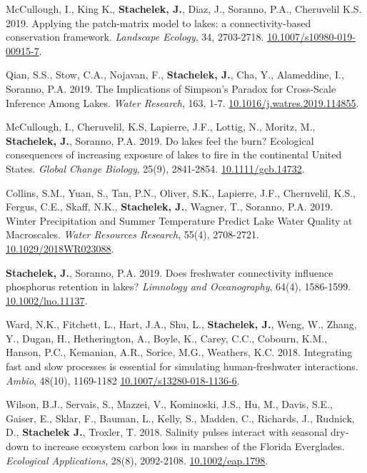\documentclass[11pt]{article}
\makeatletter
\newlength{\bibhang}
\newlength{\bibsep}
 {\@listi \global\bibsep\itemsep \global\advance\bibsep by\parsep}
\newenvironment{bibenum*}
  {\renewcommand\labelenumi{[\theenumi]}%
   \etaremune[
     topsep=0pt,
     itemsep=\bibsep,
     parsep=0pt,partopsep=0pt,
     itemindent=-\bibhang,
     leftmargin=0.8em
     ]
     }
  {\endetaremune}
\makeatother
\begin{document}
\begin{bibenum*}
    \item McCullough, I., King K., \textbf{Stachelek, J.}, Diaz, J., Soranno, P.A., Cheruvelil K.S. 2019. Applying the patch-matrix model to lakes: a connectivity-based conservation framework. \emph{Landscape Ecology}, 34, 2703-2718. \href{https://doi.org/10.1007/s10980-019-00915-7}{10.1007/s10980-019-00915-7}.

    \item Qian, S.S., Stow, C.A., Nojavan, F., \textbf{Stachelek, J.}, Cha, Y., Alameddine, I., Soranno, P.A. 2019. The Implications of Simpson's Paradox for Cross-Scale Inference Among Lakes. \emph{Water Research}, 163, 1-7. \href{https://doi.org/10.1016/j.watres.2019.114855}{10.1016/j.watres.2019.114855}.

    \item McCullough, I., Cheruvelil, K.S, Lapierre, J.F., Lottig, N., Moritz, M., \textbf{Stachelek, J.}, Soranno, P.A. 2019. Do lakes feel the burn? Ecological consequences of increasing exposure of lakes to fire in the continental United States. \emph{Global Change Biology}, 25(9), 2841-2854. \href{https://doi.org/10.1111/gcb.14732}{10.1111/gcb.14732}.

    \item Collins, S.M., Yuan, S., Tan, P.N., Oliver, S.K., Lapierre, J.F., Cheruvelil, K.S., Fergus, C.E., Skaff, N.K., \textbf{Stachelek, J.}, Wagner, T., Soranno, P.A. 2019. Winter Precipitation and Summer Temperature Predict Lake Water Quality at Macroscales. \emph{Water Resources Research}, 55(4), 2708-2721. \href{https://doi.org/10.1029/2018WR023088}{10.1029/2018WR023088}.

    \item \textbf{Stachelek, J.}, Soranno, P.A. 2019. Does freshwater connectivity influence phosphorus retention in lakes? \emph{Limnology and Oceanography}, 64(4), 1586-1599. \href{https://doi.org/10.1002/lno.11137}{10.1002/lno.11137}.

    \item Ward, N.K., Fitchett, L., Hart, J.A., Shu, L., \textbf{Stachelek, J.}, Weng, W., Zhang, Y., Dugan, H., Hetherington, A., Boyle, K., Carey, C.C., Cobourn, K.M., Hanson, P.C., Kemanian, A.R., Sorice, M.G., Weathers, K.C. 2018. Integrating fast and slow processes is essential for simulating human-freshwater interactions. \emph{Ambio}, 48(10), 1169-1182 \href{https://doi.org/10.1007/s13280-018-1136-6}{10.1007/s13280-018-1136-6}.

    \item Wilson, B.J., Servais, S., Mazzei, V., Kominoski, J.S., Hu, M., Davis, S.E., Gaiser, E., Sklar, F., Bauman, L., Kelly, S., Madden, C., Richards, J., Rudnick, D., \textbf{Stachelek J.}, Troxler, T. 2018. Salinity pulses interact with seasonal dry‐down to increase ecosystem carbon loss in marshes of the Florida Everglades. \emph{Ecological Applications}, 28(8), 2092-2108. \href{https://doi.org/10.1002/eap.1798}{10.1002/eap.1798}.


\end{bibenum*}
\end{document}
